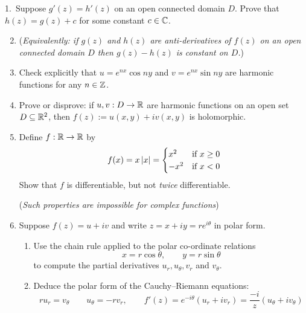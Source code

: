 % 

\vfill\goodbreak

\begin{exercises*}{}
\hangindent\leftmargini
\textup{1.}\ Suppose $g'(z)=h'(z)$  on an open connected domain $D$. Prove that $h(z)=g(z)+c$ for some constant $c\in\mathbb{C}$.\vspace{-5pt}
\begin{enumerate}\setcounter{enumi}{1}
  \item[](\emph{Equivalently: if $g(z)$ and $h(z)$ are anti-derivatives of $f(z)$ on an open connected domain $D$ then $g(z)-h(z)$ is constant on $D$.})
  
  \item Check explicitly that $u=e^{nx}\cos ny$ and $v=e^{nx}\sin ny$ are harmonic functions for any $n\in\mathbb{Z}$.
  
  \item Prove or disprove: if $u,v:D\to\mathbb{R}$ are harmonic functions on an open set $D\subseteq\mathbb{R}^2$, then $f(z):=u(x,y)+iv(x,y)$ is holomorphic.
  
  \item\label{exs:realoncediff} Define $f:\mathbb{R}\to\mathbb{R}$ by
	\[f(x)=x\left| x\right|=\begin{cases}
		x^2&\text{if }x\ge 0\\
		-x^2&\text{if }x<0
		\end{cases}\]
		Show that $f$ is differentiable, but not \emph{twice} differentiable.\par
		(\emph{Such properties are impossible for complex functions})
  
  \item\label{exs:crpolar} Suppose $f(z)=u+iv$ and write $z=x+iy=re^{i\theta}$ in polar form.
  \begin{enumerate}
    \item Use the chain rule applied to the polar co-ordinate relations
  	\[x=r\cos\theta,\qquad y=r\sin\theta\]
  	to compute the partial derivatives $u_r,u_\theta,v_r$ and $v_\theta$.
  	\item Deduce the polar form of the Cauchy--Riemann equations:
		\[ru_r=v_\theta\qquad u_\theta=-rv_r,\qquad f'(z)=e^{-i\theta}(u_r+iv_r) =\frac{-i}{z}(u_\theta+iv_\theta)\]
	\end{enumerate}
	

\end{enumerate}
\end{exercises*}
